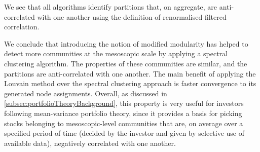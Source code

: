 We see that all algorithms identify partitions that, on aggregate, are anti-correlated with one another using the definition of renormalised filtered correlation.

We conclude that introducing the notion of modified modularity has helped to detect more communities at the mesoscopic scale by applying a spectral clustering algorithm.
The properties of these communities are similar, and the partitions are anti-correlated with one another.
The main benefit of applying the Louvain method over the spectral clustering approach is faster convergence to its generated node assignments.
Overall, as discussed in \cref{subsec:portfolioTheoryBackground}, this property is very useful for investors following mean-variance portfolio theory, since it provides a basis for picking stocks belonging to mesoscopic-level communities that are, on average over a specified period of time (decided by the investor and given by selective use of available data), negatively correlated with one another.

